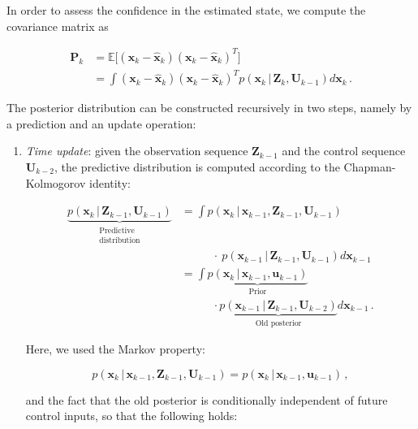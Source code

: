 \noindent
In order to assess the confidence in the estimated state, we compute the covariance matrix as

\begin{equation}
\begin{split}
  \bm{P}_k &= \mathbb{E}\Big[(\bm{x}_k - \hat{\bm{x}}_{k})(\bm{x}_k - \hat{\bm{x}}_{k})^T\Big] \\
  &= \int (\bm{x}_k - \hat{\bm{x}}_{k})(\bm{x}_k - \hat{\bm{x}}_{k})^T p(\bm{x}_k\,|\,\bm{Z}_{k}, \bm{U}_{k-1}) d\bm{x}_k\,.
\end{split}
\end{equation}


 The posterior distribution can be constructed recursively in two steps, namely by a prediction and an update operation:

\begin{enumerate}
\item \emph{Time update}: given the observation sequence $\bm{Z}_{k-1}$ and the control sequence $\bm{U}_{k-2}$, the predictive distribution is computed according to the Chapman-Kolmogorov identity:

\begin{equation}\label{eq:chapman_kolmogorov}
\begin{split}
  \underbrace{p(\bm{x}_k\,|\,\bm{Z}_{k-1}, \bm{U}_{k-1})}_{\substack{\text{Predictive} \\ \text{distribution}}}
  &= \int p(\bm{x}_k\,|\,\bm{x}_{k-1}, \bm{Z}_{k-1}, \bm{U}_{k-1}) \\
  &\mathrel{\phantom{iiiiiiii}} \cdot\:p(\bm{x}_{k-1}\,|\,\bm{Z}_{k-1}, \bm{U}_{k-1}) d\bm{x}_{k-1} \\
  &= \int \underbrace{p(\bm{x}_k\,|\,\bm{x}_{k-1}, \bm{u}_{k-1})}_\text{Prior} \\
  &\mathrel{\phantom{iiiiiiii}} \cdot \underbrace{p(\bm{x}_{k-1}\,|\,\bm{Z}_{k-1}, \bm{U}_{k-2})}_\text{Old posterior} d\bm{x}_{k-1}\,.
  \end{split}
\end{equation}

\noindent
Here, we used the Markov property:

\begin{equation}\label{eq:markov_property}
  p(\bm{x}_k\,|\,\bm{x}_{k-1}, \bm{Z}_{k-1}, \bm{U}_{k-1}) = p(\bm{x}_k\,|\,\bm{x}_{k-1}, \bm{u}_{k-1})\,,
\end{equation}

\noindent
and the fact that the old posterior is conditionally independent of future control inputs, so that the following holds:


\end{enumerate}
